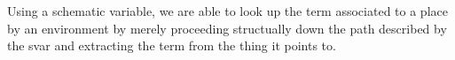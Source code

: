 Using a schematic variable, we are able to look up the term associated to
a place by an environment by merely proceeding structually down the path
described by the svar and extracting the term from the thing it points to.

\begin{code}%
\>[0]\AgdaSpace{}%
\AgdaSpace{}%
\AgdaSymbol{:}\AgdaSpace{}%
\AgdaSpace{}%
\AgdaSpace{}%
\AgdaSpace{}%
\AgdaSpace{}%
\AgdaSpace{}%
\AgdaSpace{}%
\<%
\\
\>[0][@{}l@{\AgdaIndent{0}}]%
\>[2]%
\>[8]\AgdaSymbol{:}\AgdaSpace{}%
\AgdaSymbol{\{}\AgdaSpace{}%
\AgdaSymbol{:}\AgdaSpace{}%
\AgdaSpace{}%
\AgdaSpace{}%
\AgdaSymbol{\}}\AgdaSpace{}%
\AgdaSpace{}%
\AgdaSpace{}%
\AgdaSymbol{(}\AgdaSpace{}%
\AgdaSymbol{)}\AgdaSpace{}%
\<%
\\
%
\>[2]%
\>[8]\AgdaSymbol{:}\AgdaSpace{}%
\AgdaSpace{}%
\AgdaSpace{}%
\AgdaSpace{}%
\AgdaSpace{}%
\AgdaSpace{}%
\AgdaSymbol{(}\AgdaSpace{}%
\AgdaSpace{}%
\AgdaSymbol{)}\AgdaSpace{}%
\<%
\\
%
\>[2]%
\>[8]\AgdaSymbol{:}\AgdaSpace{}%
\AgdaSpace{}%
\AgdaSpace{}%
\AgdaSpace{}%
\AgdaSpace{}%
\AgdaSpace{}%
\AgdaSymbol{(}\AgdaSpace{}%
\AgdaSpace{}%
\AgdaSymbol{)}\AgdaSpace{}%
\<%
\\
%
\>[2]%
\>[8]\AgdaSymbol{:}\AgdaSpace{}%
\AgdaSpace{}%
\AgdaSpace{}%
\AgdaSpace{}%
\AgdaSpace{}%
\AgdaSpace{}%
\AgdaSymbol{(}\AgdaSpace{}%
\AgdaSymbol{)}\AgdaSpace{}%
\<%
\\
%

\end{code}
